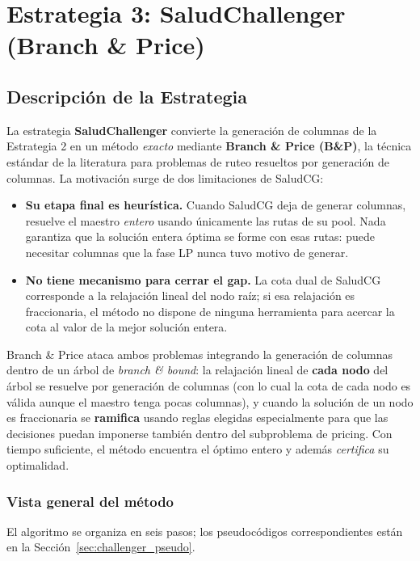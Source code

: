 \documentclass[12pt]{article}
\numberwithin{algorithm}{section}
\begin{document}
\newpage
\section{Estrategia 3: SaludChallenger (Branch \& Price)}

\subsection{Descripción de la Estrategia}

La estrategia \textbf{SaludChallenger} convierte la generación de columnas de la Estrategia 2 en un método \emph{exacto} mediante \textbf{Branch \& Price (B\&P)}, la técnica estándar de la literatura para problemas de ruteo resueltos por generación de columnas. La motivación surge de dos limitaciones de SaludCG:

\begin{itemize}
    \item \textbf{Su etapa final es heurística.} Cuando SaludCG deja de generar columnas, resuelve el maestro \emph{entero} usando únicamente las rutas de su pool. Nada garantiza que la solución entera óptima se forme con esas rutas: puede necesitar columnas que la fase LP nunca tuvo motivo de generar.
    \item \textbf{No tiene mecanismo para cerrar el gap.} La cota dual de SaludCG corresponde a la relajación lineal del nodo raíz; si esa relajación es fraccionaria, el método no dispone de ninguna herramienta para acercar la cota al valor de la mejor solución entera.
\end{itemize}

Branch \& Price ataca ambos problemas integrando la generación de columnas dentro de un árbol de \emph{branch \& bound}: la relajación lineal de \textbf{cada nodo} del árbol se resuelve por generación de columnas (con lo cual la cota de cada nodo es válida aunque el maestro tenga pocas columnas), y cuando la solución de un nodo es fraccionaria se \textbf{ramifica} usando reglas elegidas especialmente para que las decisiones puedan imponerse también dentro del subproblema de pricing. Con tiempo suficiente, el método encuentra el óptimo entero y además \emph{certifica} su optimalidad.

\subsubsection*{Vista general del método}

El algoritmo se organiza en seis pasos; los pseudocódigos correspondientes están en la Sección~\ref{sec:challenger_pseudo}.
\end{document}
